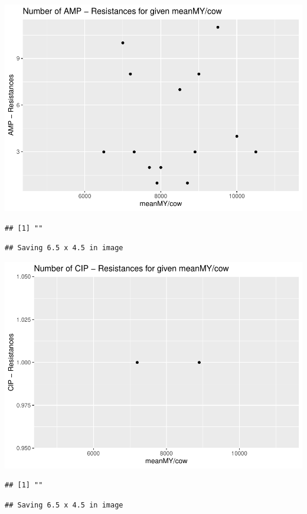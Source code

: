 \documentclass[
]{article}
\begin{document}
\includegraphics{NResistenzen_files/figure-latex/numerical_variables-1.pdf}

\begin{verbatim}
## [1] ""
\end{verbatim}

\begin{verbatim}
## Saving 6.5 x 4.5 in image
\end{verbatim}

\includegraphics{NResistenzen_files/figure-latex/numerical_variables-2.pdf}

\begin{verbatim}
## [1] ""
\end{verbatim}

\begin{verbatim}
## Saving 6.5 x 4.5 in image
\end{verbatim}
\end{document}
